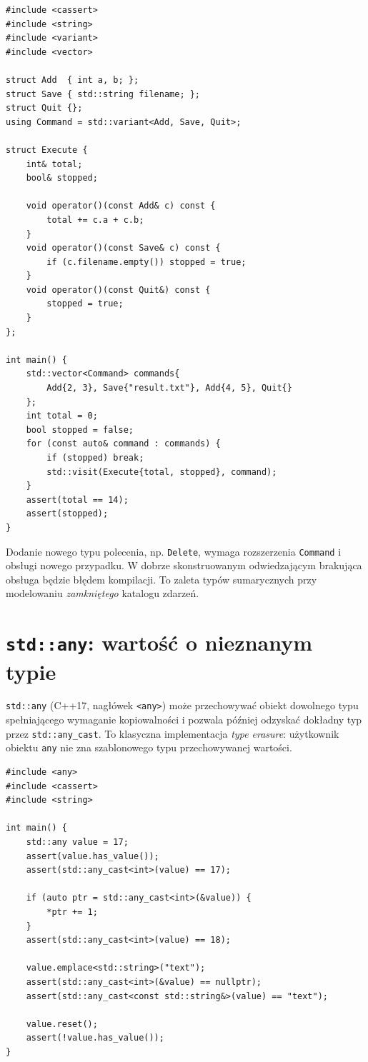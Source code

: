 \begin{lstlisting}[caption={Modelowanie poleceń za pomocą variant; kompletny program.}]
#include <cassert>
#include <string>
#include <variant>
#include <vector>

struct Add  { int a, b; };
struct Save { std::string filename; };
struct Quit {};
using Command = std::variant<Add, Save, Quit>;

struct Execute {
    int& total;
    bool& stopped;

    void operator()(const Add& c) const {
        total += c.a + c.b;
    }
    void operator()(const Save& c) const {
        if (c.filename.empty()) stopped = true;
    }
    void operator()(const Quit&) const {
        stopped = true;
    }
};

int main() {
    std::vector<Command> commands{
        Add{2, 3}, Save{"result.txt"}, Add{4, 5}, Quit{}
    };
    int total = 0;
    bool stopped = false;
    for (const auto& command : commands) {
        if (stopped) break;
        std::visit(Execute{total, stopped}, command);
    }
    assert(total == 14);
    assert(stopped);
}
\end{lstlisting}

Dodanie nowego typu polecenia, np. \texttt{Delete}, wymaga rozszerzenia
\texttt{Command} i obsługi nowego przypadku. W dobrze skonstruowanym
odwiedzającym brakująca obsługa będzie błędem kompilacji. To zaleta
typów sumarycznych przy modelowaniu \emph{zamkniętego} katalogu zdarzeń.

\section{\texttt{std::any}: wartość o nieznanym typie}
\label{sec:cpp14-any}

\texttt{std::any} (C++17, nagłówek \texttt{<any>}) może przechowywać
obiekt dowolnego typu spełniającego wymaganie kopiowalności i pozwala
później odzyskać dokładny typ przez \texttt{std::any\_cast}. To klasyczna
implementacja \emph{type erasure}: użytkownik obiektu \texttt{any}
nie zna szablonowego typu przechowywanej wartości.

\begin{lstlisting}[caption={std::any i bezpieczne wydobycie typu (C++17); kompletny program.}]
#include <any>
#include <cassert>
#include <string>

int main() {
    std::any value = 17;
    assert(value.has_value());
    assert(std::any_cast<int>(value) == 17);

    if (auto ptr = std::any_cast<int>(&value)) {
        *ptr += 1;
    }
    assert(std::any_cast<int>(value) == 18);

    value.emplace<std::string>("text");
    assert(std::any_cast<int>(&value) == nullptr);
    assert(std::any_cast<const std::string&>(value) == "text");

    value.reset();
    assert(!value.has_value());
}
\end{lstlisting}

